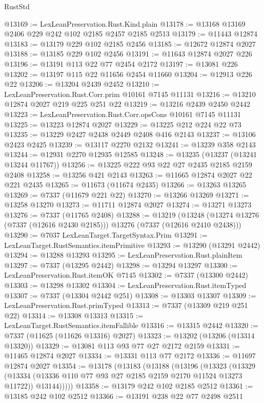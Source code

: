 \begin{lexlean}{RustStd}
\begin{coremodule}
@13169 := LexLeanPreservation.Rust.Kind.plain
@13178 := @13168 @13169 @2406 @229 @242 @102 @2185 @2457 @2185 @2513
@13179 := @11443 @12874
@13183 := @13179 @229 @102 @2185 @2456
@13185 := @12672 @12874 @2027
@13188 := @13185 @229 @102 @2456
@13191 := @11643 @12874 @2027 @226
@13196 := @13191 @113 @22 @77 @2454 @2172
@13197 := @13081 @226
@13202 := @13197 @115 @22 @11656 @2454 @11660
@13204 := @12913 @226 @22
@13206 := @13204 @2439 @2452
@13210 := LexLeanPreservation.Rust.Corr.prim @10161 @7145 @11131
@13216 := @13210 @12874 @2027 @219 @225 @251 @22
@13219 := @13216 @2439 @2450 @2442
@13223 := LexLeanPreservation.Rust.Corr.opsCons @10161 @7145 @11131
@13225 := @13223 @12874 @2027
@13229 := @13225 @212 @224 @22 @73
@13235 := @13229 @2427 @2438 @2449 @2408 @416 @2143
@13237 := @13106 @2423 @2425
@13239 := @13117 @2270 @2132
@13241 := @13239 @358 @2143
@13244 := @12931 @2270 @12935 @12585
@13248 := @13235 (@13237 (@13241 @13244 @11767))
@13256 := @13225 @222 @93 @22 @27 @2435 @2185 @2159 @2408
@13258 := @13256 @421 @2143
@13263 := @11665 @12874 @2027 @22 @221 @2435
@13265 := @11673 (@11674 @2435)
@13266 := @13263 @13265
@13269 := @7337 (@11679 @221 @22)
@13270 := @13266 @13269
@13271 := @13258 @13270
@13273 := @11711 @12874 @2027
@13274 := @13271 @13273
@13276 := @7337 (@11765 @2408)
@13288 := @13219
    (@13248 (@13274 @13276 (@7337 (@12616 @2430 @2185))) @13276 (@7337 (@12616 @2410 @2438)))
@13290 := @7037 LexLeanTarget.TargetSyntax.Prim
@13291 := LexLeanTarget.RustSemantics.itemPrimitive
@13293 := @13290 (@13291 @2442)
@13294 := @13288 @13293
@13295 := LexLeanPreservation.Rust.plainItem
@13297 := @7337 (@13295 @2442)
@13298 := @13294 @13297
@13300 := LexLeanPreservation.Rust.itemOK @7145
@13302 := @7337 (@13300 @2442)
@13303 := @13298 @13302
@13304 := LexLeanPreservation.Rust.itemTyped
@13307 := @7337 (@13304 @2442 @251)
@13308 := @13303 @13307
@13309 := LexLeanPreservation.Rust.primTyped
@13313 := @7337 (@13309 @219 @251 @22)
@13314 := @13308 @13313
@13315 := LexLeanTarget.RustSemantics.itemFallible
@13316 := @13315 @2442
@13320 := @7337 (@11625 (@11626 @13316) @2027)
@13323 := @13202 (@13206 (@13314 @13320))
@13329 := @13081 @113 @93 @77 @27 @2172 @2159
@13331 := @11465 @12874 @2027
@13334 := @13331 @113 @77 @2172
@13336 := @11697 @12874 @2027
@13354 := @13178
    (@13183
      (@13188
        (@13196
          (@13323
            (@13329
              (@13334 (@13336 @110 @77 @93 @27 @2185 @2159 @2170 @11524 @13273 @11722))
              @13144)))))
@13358 := @13179 @242 @102 @2185 @2512
@13361 := @13185 @242 @102 @2512
@13366 := @13191 @238 @22 @77 @2498 @2511

\end{coremodule}
\end{lexlean}
